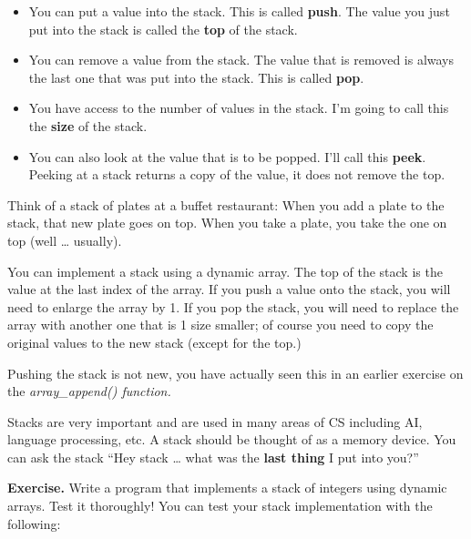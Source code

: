\documentclass[
]{article}
\providecommand{\tightlist}{%
  \setlength{\itemsep}{0pt}\setlength{\parskip}{0pt}}
\begin{document}
\begin{itemize}
\tightlist
\item
  You can put a value into the stack. This is called \textbf{push}. The
  value you just put into the stack is called the \textbf{top} of the
  stack.
\item
  You can remove a value from the stack. The value that is removed is
  always the last one that was put into the stack. This is called
  \textbf{pop}.
\item
  You have access to the number of values in the stack. I'm going to
  call this the \textbf{size} of the stack.
\item
  You can also look at the value that is to be popped. I'll call this
  \textbf{peek}. Peeking at a stack returns a copy of the value, it does
  not remove the top.
\end{itemize}

Think of a stack of plates at a buffet restaurant: When you add a plate
to the stack, that new plate goes on top. When you take a plate, you
take the one on top (well \ldots{} usually).

You can implement a stack using a dynamic array. The top of the stack is
the value at the last index of the array. If you push a value onto the
stack, you will need to enlarge the array by 1. If you pop the stack,
you will need to replace the array with another one that is 1 size
smaller; of course you need to copy the original values to the new stack
(except for the top.)

Pushing the stack is not new, you have actually seen this in an earlier
exercise on the \emph{array\_append() function.}

Stacks are very important and are used in many areas of CS including AI,
language processing, etc. A stack should be thought of as a memory
device. You can ask the stack ``Hey stack \ldots{} what was the
\textbf{last thing} I put into you?''

\textbf{Exercise.} Write a program that implements a stack of integers
using dynamic arrays. Test it thoroughly! You can test your stack
implementation with the following:
\end{document}
